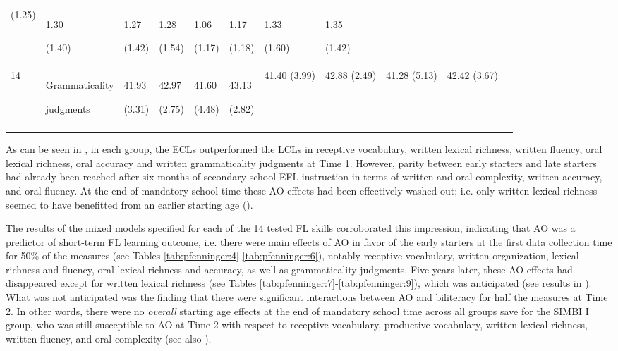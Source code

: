 \documentclass[output=paper,modfonts,nonflat,newtxmath]{langsci/langscibook}
\begin{document}
\begin{table}
{\begin{tabularx}{\textwidth}{l p{4cm} YYYYYYYYY}
 (1.25) & { 1.30}

 (1.40) & { 1.27}

 (1.42) & { 1.28}

 (1.54) & { 1.06}

 (1.17) & { 1.17}

 (1.18) & { 1.33}

 (1.60) & { 1.35}

 (1.42)\\
 14 & Grammaticality

judgments & { 41.93}

 (3.31) & { 42.97}

 (2.75) & { 41.60}

 (4.48) & { 43.13}

 (2.82) & { 41.40} (3.99) & { 42.88} (2.49) & { 41.28} (5.13) & { 42.42} (3.67)\\
\lspbottomrule
\end{tabularx}
}

\end{table}

As can be seen in , in each group, the ECLs outperformed the LCLs in receptive vocabulary, written lexical richness, written fluency, oral lexical richness, oral accuracy and written grammaticality judgments at Time 1. However, parity between early starters and late starters had already been reached after six months of secondary school EFL instruction in terms of written and oral complexity, written accuracy, and oral fluency. At the end of mandatory school time these AO effects had been effectively washed out; i.e. only written lexical richness seemed to have benefitted from an earlier starting age ().

The results of the mixed models specified for each of the 14 tested FL skills corroborated this impression, indicating that AO was a predictor of short-term FL learning outcome, i.e. there were main effects of AO in favor of the early starters at the first data collection time for 50\% of the measures (see Tables \ref{tab:pfenninger:4}-\ref{tab:pfenninger:6}), notably receptive vocabulary, written organization, lexical richness and fluency, oral lexical richness and accuracy, as well as grammaticality judgments. Five years later, these AO effects had disappeared except for written lexical richness (see Tables \ref{tab:pfenninger:7}-\ref{tab:pfenninger:9}), which was anticipated (see results in \citealt{PfenningerSingleton2017}). What was not anticipated was the finding that there were significant interactions between AO and biliteracy for half the measures at Time 2. In other words, there were no \textit{overall} starting age effects at the end of mandatory school time across all groups save for the SIMBI I group, who was still susceptible to AO at Time 2 with respect to receptive vocabulary, productive vocabulary, written lexical richness, written fluency, and oral complexity (see also \citealt{PfenningerSingleton2019}).
\end{document}
